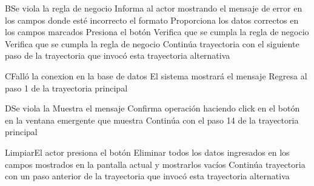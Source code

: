 
\begin{UCtrayectoriaA}{B}{Se viola la regla de negocio }	
			\UCpaso[\UCsist] Informa al actor mostrando el mensaje de error  en los campos donde esté incorrecto el formato
			\UCpaso[\UCactor] Proporciona los datos correctos en los campos marcados 
			\UCpaso[\UCactor] Presiona el botón   
			\UCpaso[\UCsist] Verifica que se cumpla la regla de negocio  
		\UCpaso[\UCsist] Verifica que se cumpla la regla de negocio  
			\UCpaso[\UCsist] Continúa trayectoria con el siguiente paso de la trayectoria que invocó esta trayectoria alternativa
\end{UCtrayectoriaA}


\begin{UCtrayectoriaA}{C}{Falló la conexion en la base de datos}
			\UCpaso[\UCsist] El sistema mostrará el mensaje 
			\UCpaso[\UCsist] Regresa al paso 1 de la trayectoria principal  
\end{UCtrayectoriaA}


\begin{UCtrayectoriaA}{D}{Se viola la }
			\UCpaso[\UCsist] Muestra el mensaje  
			\UCpaso[\UCactor] Confirma operación haciendo click en el botón  en la ventana emergente que muestra
			\UCpaso[\UCsist] Continúa con el paso 14 de la trayectoria principal  
\end{UCtrayectoriaA}


\begin{UCtrayectoriaA}{Limpiar}{El actor presiona el botón }
			\UCpaso[\UCsist] Eliminar todos los datos ingresados en los campos mostrados en la pantalla actual y mostrarlos vacíos
			\UCpaso[\UCsist] Continúa trayectoria con un paso anterior de la trayectoria que invocó esta trayectoria alternativa
\end{UCtrayectoriaA}